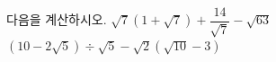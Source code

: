 다음을 계산하시오.
 $\sqrt{7}(1+\sqrt{7})+\dfrac{14}{\sqrt{7}}-\sqrt{63}$
 $(10-2\sqrt{5})\div\sqrt{5}-\sqrt{2}(\sqrt{10}-3)$
